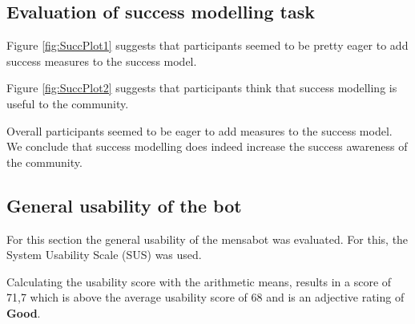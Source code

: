 \subsection{Evaluation of success modelling task}
Figure \ref{fig:SuccPlot1} suggests that participants seemed to be pretty eager to add success measures to the success model.


Figure \ref{fig:SuccPlot2} suggests that participants think that success modelling is useful to the community.

Overall participants seemed to be eager to add measures to the success model.
We conclude that success modelling does indeed increase the success awareness of the community. 

\subsection{General usability of the bot}
For this section the general usability of the mensabot was evaluated. For this, the System Usability Scale (SUS) was used.

Calculating the usability score with the arithmetic means, results in a score of 71,7 which is above the average usability score of 68 and is an adjective rating of \textbf{Good}. 